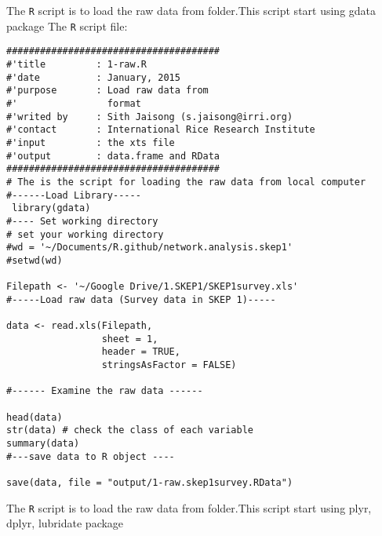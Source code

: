 \documentclass[idxtotoc,hyperref,openany]{labbook} %
\begin{document}
The {\tt{R}} script is to load the raw data from folder.This script start using gdata package \cite{package:gdata}\newline
\lstset{language=R}
The {\tt{R}} script file:
\begin{lstlisting}
######################################
#'title         : 1-raw.R
#'date          : January, 2015
#'purpose       : Load raw data from 
#'                format
#'writed by     : Sith Jaisong (s.jaisong@irri.org)
#'contact       : International Rice Research Institute
#'input         : the xts file                
#'output        : data.frame and RData 
######################################
# The is the script for loading the raw data from local computer
#------Load Library-----
 library(gdata)
#---- Set working directory 
# set your working directory
#wd = '~/Documents/R.github/network.analysis.skep1' 
#setwd(wd)

Filepath <- '~/Google Drive/1.SKEP1/SKEP1survey.xls'
#-----Load raw data (Survey data in SKEP 1)-----

data <- read.xls(Filepath, 
                 sheet = 1, 
                 header = TRUE,
                 stringsAsFactor = FALSE)

#------ Examine the raw data ------

head(data) 
str(data) # check the class of each variable
summary(data)
#---save data to R object ----

save(data, file = "output/1-raw.skep1survey.RData")

\end{lstlisting}



The {\tt{R}} script is to load the raw data from folder.This script start using plyr, dplyr, lubridate package \cite{package:plyr, package:dplyr, package:lubridate}\newline
\end{document}
